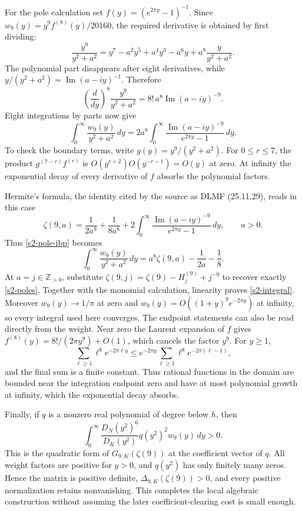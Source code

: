 For the pole calculation set $f(y)=(e^{2\pi y}-1)^{-1}$.  Since
$w_9(y)=y^9f^{(8)}(y)/20160$, the required derivative is obtained by
first dividing:
\[
 \frac{y^9}{y^2+a^2}
 =y^7-a^2y^5+a^4y^3-a^6y
    +a^8\frac{y}{y^2+a^2}.
\]
The polynomial part disappears after eight derivatives, while
$y/(y^2+a^2)=\operatorname{Im}(a-iy)^{-1}$.  Therefore
\begin{equation}
 \left(\frac{d}{dy}\right)^8\frac{y^9}{y^2+a^2}
   =8!\,a^8\operatorname{Im}(a-iy)^{-9}.
 \label{s2-eighth-derivative}
\end{equation}
Eight integrations by parts now give
\begin{equation}
 \int_0^\infty\frac{w_9(y)}{y^2+a^2}\,dy
   =2a^8\int_0^\infty
       \frac{\operatorname{Im}(a-iy)^{-9}}{e^{2\pi y}-1}\,dy.
 \label{s2-pole-ibp}
\end{equation}
To check the boundary terms, write $g(y)=y^9/(y^2+a^2)$.
For $0\leq r\leq7$, the product $g^{(7-r)}f^{(r)}$ is
$O(y^{r+2})O(y^{-r-1})=O(y)$ at zero.  At infinity the exponential
decay of every derivative of $f$ absorbs the polynomial factors.

Hermite's formula, the identity cited by the source as DLMF
(25.11.29), reads in this case
\[
 \zeta(9,a)=\frac1{2a^9}+\frac1{8a^8}
   +2\int_0^\infty
       \frac{\operatorname{Im}(a-iy)^{-9}}{e^{2\pi y}-1}\,dy,
 \qquad a>0.
\]
Thus \eqref{s2-pole-ibp} becomes
\begin{equation}
 \int_0^\infty\frac{w_9(y)}{y^2+a^2}\,dy
   =a^8\zeta(9,a)-\frac1{2a}-\frac18.
 \label{s2-hurwitz-pole}
\end{equation}
At $a=j\in\mathbb Z_{>0}$, substitute
$\zeta(9,j)=\zeta(9)-H_j^{(9)}+j^{-9}$ to recover exactly
\eqref{s2-poles}.  Together with the monomial calculation, linearity
proves \eqref{s2-integral}.  Moreover $w_9(y)\to1/\pi$ at zero and
$w_9(y)=O((1+y)^9e^{-2\pi y})$ at infinity, so every integral used
here converges.
The endpoint statements can also be read directly from the weight.
Near zero the Laurent expansion of $f$ gives
$f^{(8)}(y)=8!/(2\pi y^9)+O(1)$, which cancels the factor $y^9$.
For $y\geq1$,
\[
 \sum_{\ell\geq1}\ell^8e^{-2\pi\ell y}
 \leq e^{-2\pi y}
      \sum_{\ell\geq1}\ell^8e^{-2\pi(\ell-1)},
\]
and the final sum is a finite constant.  Thus rational functions in the
domain are bounded near the integration endpoint zero and have at most
polynomial growth at infinity, which the exponential decay absorbs.

Finally, if $q$ is a nonzero real polynomial of degree below $h$, then
\begin{equation}
 \int_0^\infty
   \frac{D_N(y^2)^6}{D_K(y^2)}q(y^2)^2w_9(y)\,dy>0.
 \label{s2-positive-quadratic-form}
\end{equation}
This is the quadratic form of $G_{9,K}(\zeta(9))$ at the coefficient
vector of $q$.  All weight factors are positive for $y>0$, and $q(y^2)$
has only finitely many zeros.  Hence the matrix is positive definite,
$\Delta_{9,K}(\zeta(9))>0$, and every positive normalization retains
nonvanishing.  This completes the local algebraic construction without
assuming the later coefficient-clearing cost is small enough.
